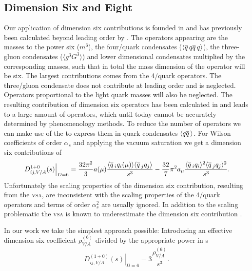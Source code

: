 \documentclass[../../index.tex]{subfiles}
\begin{document}
\subsection{Dimension Six and Eight}
Our application of dimension six contributions is founded in \cite{Braaten1991}
and has previously been calculated beyond leading order by \cite{Lanin1986}. The
operators appearing are the masses to the power six (\(m^6\)), the four\-/quark
condensates (\(\langle \overline{q}\, q \overline{q}\, q \rangle\)), the three-gluon
condensates (\(\langle g^3 G^3 \rangle\)) and lower dimensional condensates
multiplied by the corresponding masses, such that in total the mass dimension of
the operator will be six. The largest contributions comes from the 4\-/quark
operators. The three\-/gluon condensate does not contribute at leading order
\cite{Hubschmid1982} and is neglected. Operators proportional to the light quark
masses will also be neglected. The resulting contribution of dimension six
operators has been calculated in \cite{Lanin1986} and leads to a large amount of
operators, which until today cannot be accurately determined by phenomenology
methods. To reduce the number of operators we can make use of the
\cite{Beneke2008,Braaten1991,Shifman1978} to express them in quark condensates
\(\langle q \overline{q}\, \rangle\). For Wilson coefficients of order \(\alpha_s\)
and applying the vacuum saturation we get a dimension six contributions of
\begin{equation}
  \left. D_{ij,V/A}^{1+0}(s) \right\vert_{D=6} = \frac{32\pi^2}{3} a(\mu) \frac{\langle \overline{q}\,_iq_i(\mu) \rangle\langle \overline{q}\,_jq_j \rangle}{s^3}
  - \frac{32}{7} \pi^2 a_\mu \frac{\langle \overline{q}\,_i q_i \rangle^2 \langle \overline{q}\,_j q_j \rangle^2}{s^3}.
\end{equation}
Unfortunately the scaling properties of the dimension six contribution,
resulting from the \textsc{vsa}, are inconsistent with the scaling properties of
the 4\-/quark operators \cite{Narison1983,Jamin1985} and terms of order
\(\alpha_s^2\) are usually ignored. In addition to the scaling problematic the
\textsc{vsa} is known to underestimate the dimension six contribution
\cite{Launer1983}.

In our work we take the simplest approach possible: Introducing an effective
dimension six coefficient \(\rho_{V/A}^{(6)}\) divided by the appropriate power
in s
\begin{equation}
  \left. D_{ij,V/A}^{(1+0)}(s) \right\rvert_{D=6} = 3 \frac{\rho_{V/A}^{(6)}}{s^3}.
\end{equation}
\end{document}
